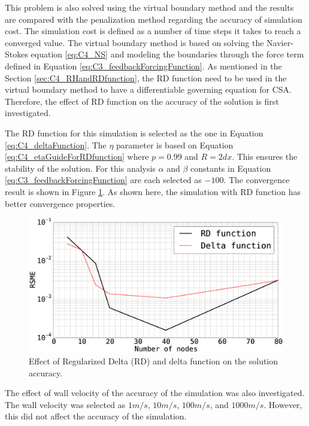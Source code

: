 This problem is also solved using the virtual boundary method and the results are compared with the penalization method regarding the accuracy of simulation cost. The simulation cost is defined as a number of time steps it takes to reach a converged value. The virtual boundary method is based on solving the Navier-Stokes equation \eqref{eq:C4_NS} and modeling the boundaries through the force term defined in Equation \eqref{eq:C3_feedbackForcingFunction}. As mentioned in the Section \ref{sec:C4_RHandRDfunction}, the RD function need to be used in the virtual boundary method to have a differentiable governing equation for CSA. Therefore, the effect of RD function on the accuracy of the solution is first investigated.

The RD function for this simulation is selected as the one in Equation \eqref{eq:C4_deltaFunction}. The $\eta$ parameter is based on Equation \eqref{eq:C4_etaGuideForRDfunction} where $p = 0.99$ and $R = 2dx$. This ensures the stability of the solution. For this analysis $\alpha$ and $\beta$ constants in Equation \eqref{eq:C3_feedbackForcingFunction} are each selected as $-100$. The convergence result is shown in Figure \ref{fig:C4_virtualBoundary_RDvsD}. As shown here, the simulation with RD function has better convergence properties.

\begin{figure}[H]
    \centering
    \includegraphics[width=12.00cm]{Chapter_4/figure/effect_of_RD_on_simulation_vs_numberOfNodes_1D_problem.eps}
    \caption{Effect of Regularized Delta (RD) and delta function on the solution accuracy.}
    \label{fig:C4_virtualBoundary_RDvsD}
\end{figure}

The effect of wall velocity of the accuracy of the simulation was also investigated. The wall velocity was selected as $1 m/s$, $10 m/s$, $100 m/s$, and $1000 m/s$. However, this did not affect the accuracy of the simulation.

